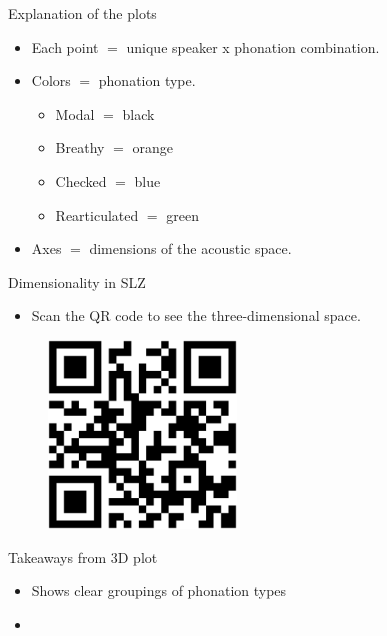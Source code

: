 \documentclass[professionalfont]{beamer}
\begin{document}
\begin{frame}{Explanation of the plots}
  \begin{itemize}
    \item Each point $=$ unique speaker x phonation combination.
    \item Colors $=$ phonation type.
    \begin{itemize}
      \item Modal $=$ black
      \item Breathy $=$ orange
      \item Checked $=$ blue
      \item Rearticulated $=$ green
    \end{itemize}
    \item Axes $=$ dimensions of the acoustic space.
  \end{itemize}
\end{frame}

\begin{frame}{Dimensionality in SLZ}
  \begin{itemize}
    \item Scan the QR code to see the three-dimensional space.
  \end{itemize}
  \begin{figure}[h!]
    \centering
    \includegraphics[width=5cm, scale=0.5]{qrcode_3d_plot.eps}
  \end{figure}
\end{frame}

\begin{frame}{Takeaways from 3D plot}
  \begin{itemize}
    \item Shows clear groupings of phonation types 
    \item 
  \end{itemize}
\end{frame}
\end{document}
